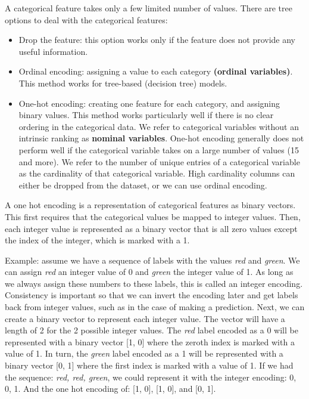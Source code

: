 \documentclass[12pt]{report}
\begin{document}
A categorical feature takes only a few limited number of values. There are tree options to deal with the categorical features:
\begin{itemize}
  \item Drop the feature: this option works only if the feature does not provide any useful information.
  \item Ordinal encoding: assigning a value to each category \textbf{(ordinal variables)}. This method works for tree-based (decision tree) models.
  \item One-hot encoding: creating one feature for each category, and assigning binary values. This method works particularly well if there is no clear ordering in the categorical data. We refer to categorical variables without an intrinsic ranking as \textbf{nominal variables}. One-hot encoding generally does not perform well if the categorical variable takes on a large number of values (15 and more). We refer to the number of unique entries of a categorical variable as the cardinality of that categorical variable. High cardinality columns can either be dropped from the dataset, or we can use ordinal encoding.
\end{itemize}

A one hot encoding is a representation of categorical features as binary vectors. This first requires that the categorical values be mapped to integer values. Then, each integer value is represented as a binary vector that is all zero values except the index of the integer, which is marked with a 1.

Example: assume we have a sequence of labels with the values \textit{red} and \textit{green}. We can assign \textit{red} an integer value of 0 and \textit{green} the integer value of 1. As long as we always assign these numbers to these labels, this is called an integer encoding. Consistency is important so that we can invert the encoding later and get labels back from integer values, such as in the case of making a prediction. Next, we can create a binary vector to represent each integer value. The vector will have a length of 2 for the 2 possible integer values. The \textit{red} label encoded as a 0 will be represented with a binary vector [1, 0] where the zeroth index is marked with a value of 1. In turn, the \textit{green} label encoded as a 1 will be represented with a binary vector [0, 1] where the first index is marked with a value of 1. If we had the sequence: \textit{red, red, green}, we could represent it with the integer encoding: 0, 0, 1. And the one hot encoding of:
[1, 0], [1, 0], and [0, 1].
\end{document}
